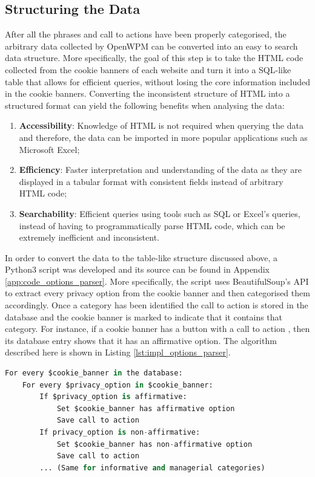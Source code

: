 \documentclass[../main.tex]{subfiles}
\begin{document}
\subsection{Structuring the Data}
After all the phrases and call to actions have been properly categorised, the arbitrary data collected by OpenWPM can be converted into an easy to search data structure. More specifically, the goal of this step is to take the HTML code collected from the cookie banners of each website and turn it into a SQL-like table that allows for efficient queries, without losing the core information included in the cookie banners. Converting the inconsistent structure of HTML into a structured format can yield the following benefits when analysing the data:

\begin{enumerate}
    \item \textbf{Accessibility}: Knowledge of HTML is not required when querying the data and therefore, the data can be imported in more popular applications such as Microsoft Excel;
    
    \item \textbf{Efficiency}: Faster interpretation and understanding of the data as they are displayed in a tabular format with consistent fields instead of arbitrary HTML code;
    
    \item \textbf{Searchability}: Efficient queries using tools such as SQL or Excel’s queries, instead of having to programmatically parse HTML code, which can be extremely inefficient and inconsistent.
\end{enumerate}

In order to convert the data to the table-like structure discussed above, a Python3 script was developed and its source can be found in Appendix \ref{app:code_options_parser}. More specifically, the script uses BeautifulSoup’s API to extract every privacy option from the cookie banner and then categorised them accordingly. Once a category has been identified the call to action is stored in the database and the cookie banner is marked to indicate that it contains that category. For instance, if a cookie banner has a button with a call to action , then its database entry shows that it has an affirmative option. The algorithm described here is shown in Listing \ref{lst:impl_options_parser}.

\begin{lstlisting}[language=Python, caption=Pseudocode of the algorithm followed by the Cookie Banner Options parser., label=lst:impl_options_parser,captionpos=b, style=lst_style]
For every $cookie_banner in the database:
    For every $privacy_option in $cookie_banner:
        If $privacy_option is affirmative:
            Set $cookie_banner has affirmative option
            Save call to action
        If privacy_option is non-affirmative:
            Set $cookie_banner has non-affirmative option
            Save call to action
        ... (Same for informative and managerial categories)
\end{lstlisting}
\end{document}
